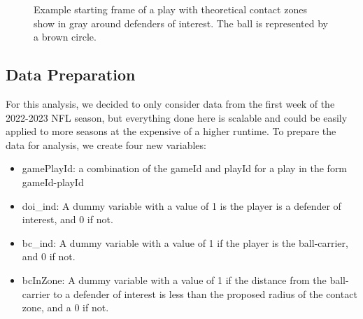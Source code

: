 \documentclass[
  12pt]{article}
\begin{document}
\begin{figure}


\caption{\label{fig-zones}Example starting frame of a play with
theoretical contact zones show in gray around defenders of interest. The
ball is represented by a brown circle.}

\end{figure}%

\subsection{Data Preparation}\label{data-preparation}

For this analysis, we decided to only consider data from the first week
of the 2022-2023 NFL season, but everything done here is scalable and
could be easily applied to more seasons at the expensive of a higher
runtime. To prepare the data for analysis, we create four new variables:

\begin{itemize}
\item
  gamePlayId: a combination of the gameId and playId for a play in the
  form gameId-playId
\item
  doi\_ind: A dummy variable with a value of 1 is the player is a
  defender of interest, and 0 if not.
\item
  bc\_ind: A dummy variable with a value of 1 if the player is the
  ball-carrier, and 0 if not.
\item
  bcInZone: A dummy variable with a value of 1 if the distance from the
  ball-carrier to a defender of interest is less than the proposed
  radius of the contact zone, and a 0 if not.
\end{itemize}
\end{document}
